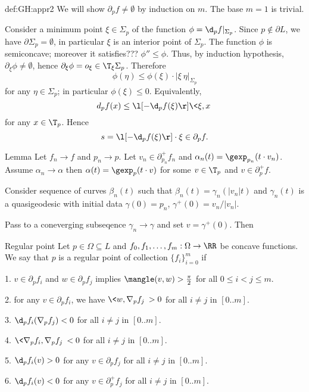 {\begin{subthm}{def:GH:appr2}
We will show $\partial_p f\not=\emptyset$ by induction on $m$.
The base $m=1$ is trivial.

Consider a minimum point  $\xi\in \Sigma_p$ of the function $\phi=\d_p f|_{\Sigma_p}$. 
Since $p\not\in\partial L$, we have $\partial\Sigma_p=\emptyset$, in particular $\xi$ is an interior point of $\Sigma_p$.
The function $\phi$ is semiconcave; 
moreover it satisfies??? $\phi''\le \phi$.
Thus, by induction hypothesis, $\partial_{\xi}\phi\not=\emptyset$, 
hence $\partial_{\xi}\phi=o_{\xi}\in \T_{\xi}\Sigma_p$.
Therefore 
$$\phi(\eta)\le \phi(\xi)\cdot|\xi\ \eta|_{\Sigma_p}$$
for any $\eta\in\Sigma_p$; in particular $\phi(\xi)\le 0$.
Equivalently,
$$d_pf(x)\le \l[-\d_p f(\xi)\r]\<\xi,x\>$$
for any $x\in \T_p$.
Hence 
$$s=\l[-\d_p f(\xi)\r]\cdot\xi\in \partial_p f.$$
\qeds


\begin{thm}{Lemma}
Let $f_n\to f$ and $p_n\to p$.
Let $v_n\in\partial^+_{p_n}f_n$ and $\alpha_n(t)=\gexp_{p_n}(t\cdot v_n)$.
Assume $\alpha_n\to \alpha$ then $\alpha(t)=\gexp_p(t\cdot v)$ for some $v\in \T_p$ and
$v\in\partial^+_pf$. 
\end{thm}

Consider sequence of curves $\beta_n(t)$ such that $\beta_n(t)=\gamma_n(|v_n|t)$ and $\gamma_n(t)$ is a quasigeodesic with initial data $\gamma(0)=p_n$, $\gamma^+(0)=v_n/|v_n|$.

Pass to a coneverging subseqence $\gamma_n\to \gamma$ and set $v=\gamma^+(0)$.
Then 
\qeds



\begin{thm}{Regular point}
Let $p\in\Omega \subseteq L$ and $f_0,f_1,\dots,f_m:\Omega\to\RR$ be concave functions.
We say that $p$ is a regular point of collection $\{f_i\}_{i=0}^m$ if 

1. $v\in\partial_pf_i$ and  $w\in\partial_pf_j$ implies $\mangle(v,w)>\tfrac\pi2$ for all $0\le i<j\le m$.

2. for any $v\in\partial_pf_i$, we have $\<w,\nabla_p f_j\>>0$ for all $i\not=j$ in $[0..m]$.

3. $\d_pf_i(\nabla_pf_j)<0$ for all $i\not=j$ in $[0..m]$.

4. $\<\nabla_pf_i,\nabla_pf_j\><0$ for all $i\not=j$ in $[0..m]$.

5. $\d_pf_i(v)>0$ for any $v\in\partial_pf_j$ for all $i\not=j$ in $[0..m]$.

6. $\d_pf_i(v)<0$ for any $v\in\partial_p^+f_j$ for all $i\not=j$ in $[0..m]$.


\end{thm}
\end{subthm}}

